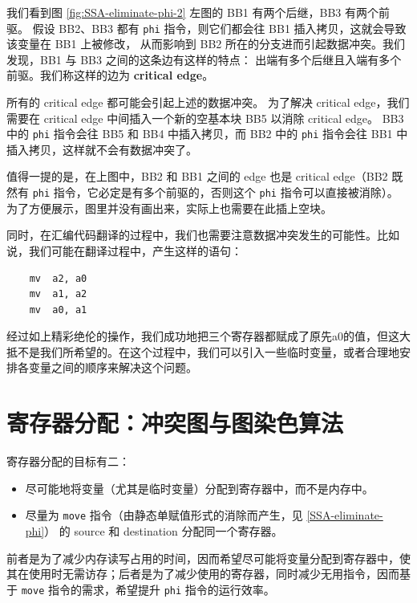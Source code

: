 我们看到图 \ref{fig:SSA-eliminate-phi-2} 左图的 BB1 有两个后继，BB3 有两个前驱。
假设 BB2、BB3 都有 \texttt{phi} 指令，则它们都会往 BB1 插入拷贝，这就会导致该变量在 BB1 上被修改，
从而影响到 BB2 所在的分支进而引起数据冲突。我们发现，BB1 与 BB3 之间的这条边有这样的特点：
出端有多个后继且入端有多个前驱。我们称这样的边为 \textbf{critical edge}。

所有的 critical edge 都可能会引起上述的数据冲突。
为了解决 critical edge，我们需要在 critical edge 中间插入一个新的空基本块 BB5 以消除 critical edge。
BB3 中的 \texttt{phi} 指令会往 BB5 和 BB4 中插入拷贝，而 BB2 中的 \texttt{phi} 指令会往
BB1 中插入拷贝，这样就不会有数据冲突了。

值得一提的是，在上图中，BB2 和 BB1 之间的 edge 也是 critical edge（BB2 既然有
\texttt{phi} 指令，它必定是有多个前驱的，否则这个 \texttt{phi} 指令可以直接被消除）。
为了方便展示，图里并没有画出来，实际上也需要在此插上空块。

同时，在汇编代码翻译的过程中，我们也需要注意数据冲突发生的可能性。比如说，我们可能在翻译过程中，产生这样的语句：
\begin{lstlisting}
	mv	a2, a0
	mv	a1, a2
 	mv	a0, a1
\end{lstlisting}

经过如上精彩绝伦的操作，我们成功地把三个寄存器都赋成了原先a0的值，但这大抵不是我们所希望的。在这个过程中，我们可以引入一些临时变量，或者合理地安排各变量之间的顺序来解决这个问题。

\section{寄存器分配：冲突图与图染色算法}

寄存器分配的目标有二：
\begin{itemize}
    \item 尽可能地将变量（尤其是临时变量）分配到寄存器中，而不是内存中。
    \item 尽量为 \texttt{move} 指令（由静态单赋值形式的消除而产生，见 \ref{SSA-eliminate-phi}）
        的 source 和 destination 分配同一个寄存器。
\end{itemize}
前者是为了减少内存读写占用的时间，因而希望尽可能将变量分配到寄存器中，使其在使用时无需访存；后者是为了减少使用的寄存器，同时减少无用指令，因而基于 \texttt{move} 指令的需求，希望提升 \texttt{phi} 指令的运行效率。

